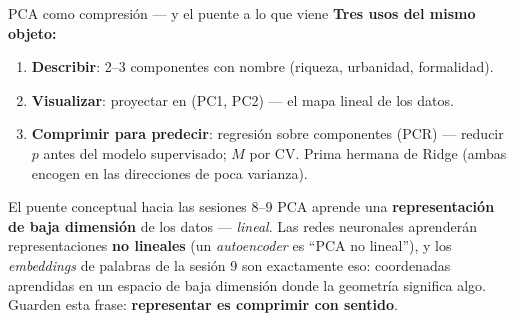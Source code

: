 \documentclass{beamer}
\newcommand{\1}{\mathbb{I}}
\begin{document}
\begin{frame}{PCA como compresión --- y el puente a lo que viene}
\small
\textbf{Tres usos del mismo objeto:}
\begin{enumerate}\itemsep4pt
  \item \textbf{Describir}: 2--3 componentes con nombre (riqueza, urbanidad, formalidad).
  \item \textbf{Visualizar}: proyectar en (PC1, PC2) --- el mapa lineal de los datos.
  \item \textbf{Comprimir para predecir}: regresión sobre componentes (PCR) --- reducir $p$ antes del modelo supervisado; $M$ por CV. Prima hermana de Ridge (ambas encogen en las direcciones de poca varianza).
\end{enumerate}
\pause

\vspace{0.2cm}
\begin{block}{El puente conceptual hacia las sesiones 8--9}
PCA aprende una \textbf{representación de baja dimensión} de los datos --- \emph{lineal}. Las redes neuronales aprenderán representaciones \textbf{no lineales} (un \emph{autoencoder} es ``PCA no lineal''), y los \emph{embeddings} de palabras de la sesión 9 son exactamente eso: coordenadas aprendidas en un espacio de baja dimensión donde la geometría significa algo. Guarden esta frase: \textbf{representar es comprimir con sentido}.
\end{block}
\end{frame}
\end{document}
